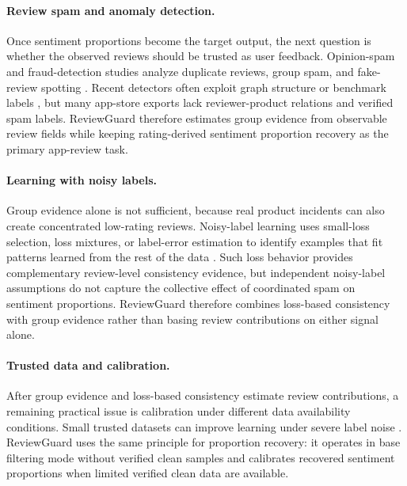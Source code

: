 \documentclass[runningheads]{llncs}
\begin{document}
\paragraph{Review spam and anomaly detection.}
Once sentiment proportions become the target output, the next question is whether the observed reviews should be trusted as user feedback. Opinion-spam and fraud-detection studies analyze duplicate reviews, group spam, and fake-review spotting \cite{jindal2008opinion,mukherjee2013spotting,li2014spotting}. Recent detectors often exploit graph structure or benchmark labels \cite{rayana2015collective,dou2020caregnn,liu2021pcgnn,wu2023splitgnn}, but many app-store exports lack reviewer-product relations and verified spam labels. ReviewGuard therefore estimates group evidence from observable review fields while keeping rating-derived sentiment proportion recovery as the primary app-review task.

\paragraph{Learning with noisy labels.}
Group evidence alone is not sufficient, because real product incidents can also create concentrated low-rating reviews. Noisy-label learning uses small-loss selection, loss mixtures, or label-error estimation to identify examples that fit patterns learned from the rest of the data \cite{han2018coteaching,wei2020jocor,li2020dividemix,tan2021colearning,wei2021noisylabels,song2022survey,northcutt2021confident}. Such loss behavior provides complementary review-level consistency evidence, but independent noisy-label assumptions do not capture the collective effect of coordinated spam on sentiment proportions. ReviewGuard therefore combines loss-based consistency with group evidence rather than basing review contributions on either signal alone.

\paragraph{Trusted data and calibration.}
After group evidence and loss-based consistency estimate review contributions, a remaining practical issue is calibration under different data availability conditions. Small trusted datasets can improve learning under severe label noise \cite{hendrycks2018trusted}. ReviewGuard uses the same principle for proportion recovery: it operates in base filtering mode without verified clean samples and calibrates recovered sentiment proportions when limited verified clean data are available.
\end{document}

